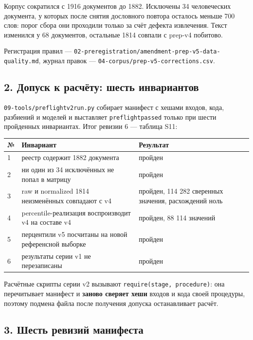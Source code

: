 \documentclass[11pt,a4paper]{article}
\renewcommand{\_}{\textunderscore\allowbreak}
\begin{document}
Корпус сократился с 1916 документов до 1882. Исключены 34 человеческих документа, у которых после снятия дословного повтора осталось меньше 700 слов: порог сбора они проходили только за счёт дефекта извлечения. Текст изменился у 68 документов, остальные 1814 совпали с prep-v4 побитово.

Регистрация правил — \texttt{02-\allowbreak{}preregistration/amendment-\allowbreak{}prep-\allowbreak{}v5-\allowbreak{}data-\allowbreak{}quality.md}, журнал правок — \texttt{04-\allowbreak{}corpus/prep-\allowbreak{}v5-\allowbreak{}corrections.csv}.

\subsection{2. Допуск к расчёту: шесть инвариантов}

\texttt{09-\allowbreak{}tools/preflight\_v2\_run.py} собирает манифест с хешами входов, кода, разбиений и моделей и выставляет \texttt{preflight\_passed} только при шести пройденных инвариантах. Итог ревизии 6 — таблица S11:

\begin{center}
\small
\begin{tabularx}{\textwidth}{lXX}
\toprule
№ & Инвариант & Результат \\
\midrule
1 & реестр содержит 1882 документа & пройден \\
2 & ни один из 34 исключённых не попал в матрицу & пройден \\
3 & raw и normalized 1814 неизменённых совпадают с v4 & пройден, 114 282 сверенных значения, расхождений ноль \\
4 & percentile-реализация воспроизводит v4 на составе v4 & пройден, 88 114 значений \\
5 & перцентили v5 посчитаны на новой референсной выборке & пройден \\
6 & результаты серии v1 не перезаписаны & пройден \\
\bottomrule
\end{tabularx}
\end{center}

Расчётные скрипты серии v2 вызывают \texttt{require(stage, procedure)}: она перечитывает манифест и \textbf{заново сверяет хеши} входов и кода своей процедуры, поэтому подмена файла после получения допуска останавливает расчёт.

\subsection{3. Шесть ревизий манифеста}
\end{document}

